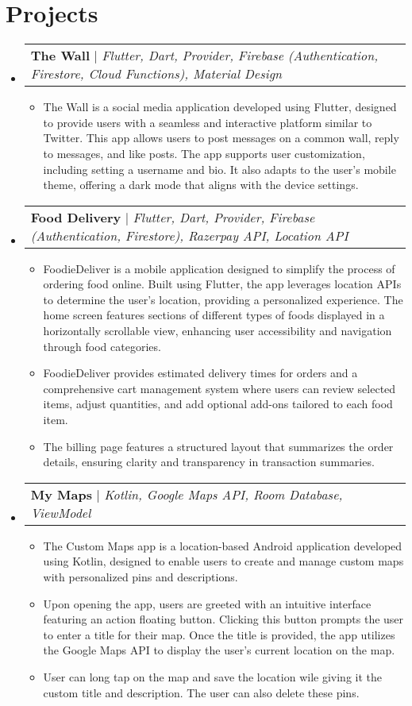 \documentclass[letterpaper,11pt]{article}
\makeatletter
\newcommand{\resumeItem}[1]{
  \item\small{
    {#1 \vspace{-2pt}}
  }
}
\newcommand{\resumeProjectHeading}[2]{
    \item
    \begin{tabular*}{0.97\textwidth}{l@{\extracolsep{\fill}}r}
      \small#1 & #2 \\
    \end{tabular*}\vspace{-7pt}
}
\newcommand{\resumeSubHeadingListStart}{\begin{itemize}[leftmargin=0.15in, label={}]}
\newcommand{\resumeSubHeadingListEnd}{\end{itemize}}
\newcommand{\resumeItemListStart}{\begin{itemize}}
\newcommand{\resumeItemListEnd}{\end{itemize}\vspace{-5pt}}
\makeatother
\begin{document}
\section{Projects}
    \resumeSubHeadingListStart
      \resumeProjectHeading
          {\textbf{The Wall} $|$ \emph{Flutter, Dart, Provider, Firebase (Authentication, Firestore, Cloud Functions), Material Design}}{}
          \resumeItemListStart
            \resumeItem{The Wall is a social media application developed using Flutter, designed to provide users with a seamless and interactive platform similar to Twitter. This app allows users to post messages on a common wall, reply to messages, and like posts. The app supports user customization, including setting a username and bio. It also adapts to the user's mobile theme, offering a dark mode that aligns with the device settings.}
          \resumeItemListEnd
      \resumeProjectHeading
          {\textbf{Food Delivery} $|$ \emph{Flutter, Dart, Provider, Firebase (Authentication, Firestore), Razerpay API, Location API}}{}
          \resumeItemListStart
            \resumeItem{FoodieDeliver is a mobile application designed to simplify the process of ordering food online. Built using Flutter, the app leverages location APIs to determine the user's location, providing a personalized experience. The home screen features sections of different types of foods displayed in a horizontally scrollable view, enhancing user accessibility and navigation through food categories.}
            \resumeItem{FoodieDeliver provides estimated delivery times for orders and a comprehensive cart management system where users can review selected items, adjust quantities, and add optional add-ons tailored to each food item.}
            \resumeItem{The billing page features a structured layout that summarizes the order details, ensuring clarity and transparency in transaction summaries.}
          \resumeItemListEnd
     \resumeProjectHeading
          {\textbf{My Maps} $|$ \emph{Kotlin, Google Maps API, Room Database, ViewModel}}{}
          \resumeItemListStart
            \resumeItem{The Custom Maps app is a location-based Android application developed using Kotlin, designed to enable users to create and manage custom maps with personalized pins and descriptions.}
            \resumeItem{Upon opening the app, users are greeted with an intuitive interface featuring an action floating button. Clicking this button prompts the user to enter a title for their map. Once the title is provided, the app utilizes the Google Maps API to display the user's current location on the map.}
            \resumeItem{User can long tap on the map and save the location wile giving it the custom title and description. The user can also delete these pins.}
          \resumeItemListEnd
    \resumeSubHeadingListEnd



%


\end{document}
